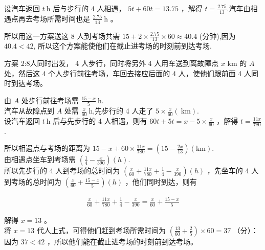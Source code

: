 \documentclass[10pt]{article}
\begin{document}
设汽车返回 $t \mathrm{~h}$ 后与步行的 4 人相遇， $5 t+60 t=13.75$ ，解得 $t=\frac{2.75}{13}$.汽车由相遇点再去考场所需时间也是 $\frac{2.75}{13} \mathrm{~h}$ 。

所以用这一方案送这 8 人到考场共需 $15+2 \times \frac{2.75}{13} \times 60 \approx 40.4$ (分钟),因为 $40.4<42$, 所以这个方案能使他们在截止进考场的时刻前到达考场.

方案 2:8人同时出发， 4 人步行，同时将另外 4 人用车送到离故障点 $x$ km 的 $A$ 处，然后这 4 个人步行前往考场，车回去接应后面的 4 人，使他们跟前面 4 人同时到达考场。

由 $A$ 处步行前往考场需 $\frac{15-x}{5} \mathrm{~h}$.\\
汽车从故障点到 $A$ 处需 $\frac{x}{60} \mathrm{~h}$,先步行的 4 人走了 $5 \times \frac{x}{60}(\mathrm{~km})$.\\
设汽车返回 $t \mathrm{~h}$ 后与先步行的 4 人相遇，则有 $60 t+5 t=x-5 \times \frac{x}{60}$ ，解得 $t=\frac{11 x}{780}$.

所以相遇点与考场的距离为 $15-x+60 \times \frac{11 x}{780}=\left(15-\frac{2 x}{13}\right)(\mathrm{km})$.\\
由相遇点坐车到考场需 $\left(\frac{1}{4}-\frac{x}{390}\right)(h)$.\\
所以先步行的 4 人到考场的总时间为 $\left(\frac{x}{60}+\frac{11 x}{780}+\frac{1}{4}-\frac{x}{390}\right)(h)$ ，先坐车的 4 人到考场的总时间为 $\left(\frac{x}{60}+\frac{15-x}{5}\right)(h)$ ，他们同时到达，则有

\begin{align*}
\frac{x}{60}+\frac{11 x}{780}+\frac{1}{4}-\frac{x}{390}=\frac{x}{60}+\frac{15-x}{5}
\end{align*}

解得 $x=13$ 。\\
将 $x=13$ 代人上式，可得他们赶到考场所需时间为 $\left(\frac{13}{60}+\frac{2}{5}\right) \times 60=37$ （分）：\\
因为 $37<42$ ，所以他们能在截止进考场的时刻前到达考场。
\end{document}
